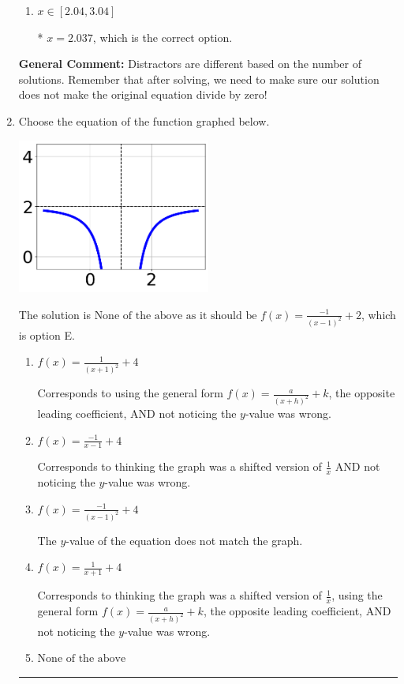 \documentclass{extbook}[14pt]
\newcommand{\litem}[1]{\item #1

\rule{\textwidth}{0.4pt}}
\begin{document}
\begin{enumerate}
{\begin{enumerate}[label=\Alph*.]
This corresponds to thinking $x = 2.037$ leads to dividing by zero in the original equation, which it does not.
\item \( x \in [2.04,3.04] \)

* $x = 2.037$, which is the correct option.
\end{enumerate}

\textbf{General Comment:} Distractors are different based on the number of solutions. Remember that after solving, we need to make sure our solution does not make the original equation divide by zero!
}
\litem{
Choose the equation of the function graphed below.

\begin{center}
    \includegraphics[width=0.5\textwidth]{../Figures/rationalGraphToEquationC.png}
\end{center}


The solution is \( \text{None of the above as it should be } f(x) = \frac{-1}{(x - 1)^2} + 2 \), which is option E.\begin{enumerate}[label=\Alph*.]
\item \( f(x) = \frac{1}{(x + 1)^2} + 4 \)

Corresponds to using the general form $f(x) = \frac{a}{(x+h)^2}+k$, the opposite leading coefficient, AND not noticing the $y$-value was wrong.
\item \( f(x) = \frac{-1}{x - 1} + 4 \)

Corresponds to thinking the graph was a shifted version of $\frac{1}{x}$ AND not noticing the $y$-value was wrong.
\item \( f(x) = \frac{-1}{(x - 1)^2} + 4 \)

The $y$-value of the equation does not match the graph.
\item \( f(x) = \frac{1}{x + 1} + 4 \)

Corresponds to thinking the graph was a shifted version of $\frac{1}{x}$, using the general form $f(x) = \frac{a}{(x+h)^2}+k$, the opposite leading coefficient, AND not noticing the $y$-value was wrong.
\item \( \text{None of the above} \)


\end{enumerate}}
\end{enumerate}
\end{document}
